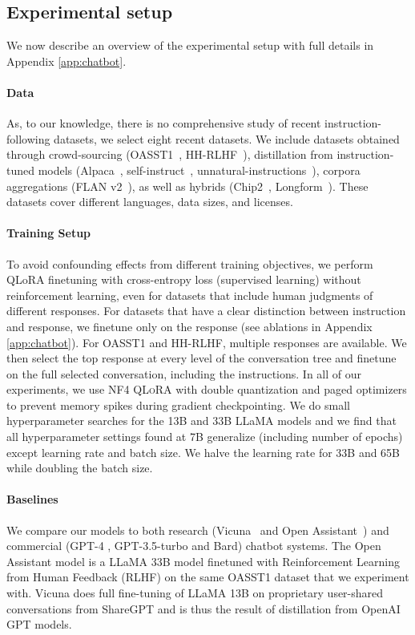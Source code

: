 \subsection{Experimental setup} We now describe an overview of the experimental setup with full details in Appendix \ref{app:chatbot}. 

\paragraph{Data} As, to our knowledge, there is no comprehensive study of recent instruction-following datasets, we select eight recent datasets. We include datasets obtained through crowd-sourcing (OASST1~\citep{kopf2023openassistant}, HH-RLHF~\citep{bai2022training}), distillation from instruction-tuned models (Alpaca~\citep{alpaca}, self-instruct~\citep{wang2022self}, unnatural-instructions~\citep{honovich2022unnatural}), corpora aggregations (FLAN v2~\citep{chung2022scaling}), as well as hybrids (Chip2~\citep{laion2023}, Longform~\citep{koksal2023longform}). These datasets cover different languages, data sizes, and licenses. 

\paragraph{Training Setup} To avoid confounding effects from different training objectives, we perform QLoRA finetuning with cross-entropy loss (supervised learning) without reinforcement learning, even for datasets that include human judgments of different responses. For datasets that have a clear distinction between instruction and response, we finetune only on the response (see ablations in Appendix \ref{app:chatbot}). For OASST1 and HH-RLHF, multiple responses are available. We then select the top response at every level of the conversation tree and finetune on the full selected conversation, including the instructions. In all of our experiments, we use NF4 \textsc{QLoRA} with double quantization and paged optimizers to prevent memory spikes during gradient checkpointing. We do small hyperparameter searches for the 13B and 33B LLaMA models and we find that all hyperparameter settings found at 7B generalize (including number of epochs) except learning rate and batch size. We halve the learning rate for 33B and 65B while doubling the batch size. 

\paragraph{Baselines} We compare our models to both research (Vicuna~\citep{vicuna2023} and Open Assistant~\citep{kopf2023openassistant}) and commercial (GPT-4 \citep{openai2023gpt}, GPT-3.5-turbo and Bard) chatbot systems. The Open Assistant model is a LLaMA 33B model finetuned with Reinforcement Learning from Human Feedback (RLHF) on the same OASST1 dataset that we experiment with. Vicuna does full fine-tuning of LLaMA 13B on proprietary user-shared conversations from ShareGPT and is thus the result of distillation from OpenAI GPT models.

